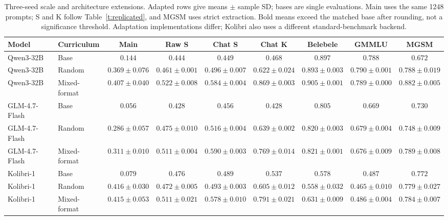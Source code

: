 \begin{table}[t]
\caption{Three-seed scale and architecture extensions. Adapted rows give means $\pm$ sample SD; bases are single evaluations. Main uses the same 1248 prompts; S and K follow Table~\ref{t:replicated}, and MGSM uses strict extraction. Bold means exceed the matched base after rounding, not a significance threshold. Adaptation implementations differ; Kolibri also uses a different standard-benchmark backend.}\label{t:scale}
\centering\scriptsize\setlength{\tabcolsep}{2.5pt}
\begin{tabular}{llccccccc}\toprule
Model & Curriculum & Main & Raw S & Chat S & Chat K & Belebele & GMMLU & MGSM\\\midrule
Qwen3-32B & Base & $0.144$ & $0.444$ & $0.449$ & $0.468$ & $0.897$ & $0.788$ & $0.672$\\
Qwen3-32B & Random & $\mathbf{0.369}\pm0.076$ & $\mathbf{0.461}\pm0.001$ & $\mathbf{0.496}\pm0.007$ & $\mathbf{0.622}\pm0.024$ & $0.893\pm0.003$ & $\mathbf{0.790}\pm0.001$ & $\mathbf{0.788}\pm0.019$\\
Qwen3-32B & Mixed-format & $\mathbf{0.407}\pm0.040$ & $\mathbf{0.522}\pm0.008$ & $\mathbf{0.584}\pm0.004$ & $\mathbf{0.869}\pm0.003$ & $\mathbf{0.905}\pm0.001$ & $\mathbf{0.789}\pm0.000$ & $\mathbf{0.882}\pm0.005$\\
GLM-4.7-Flash & Base & $0.056$ & $0.428$ & $0.456$ & $0.428$ & $0.805$ & $0.669$ & $0.730$\\
GLM-4.7-Flash & Random & $\mathbf{0.286}\pm0.057$ & $\mathbf{0.475}\pm0.010$ & $\mathbf{0.516}\pm0.004$ & $\mathbf{0.639}\pm0.002$ & $\mathbf{0.820}\pm0.003$ & $\mathbf{0.679}\pm0.004$ & $\mathbf{0.748}\pm0.009$\\
GLM-4.7-Flash & Mixed-format & $\mathbf{0.311}\pm0.010$ & $\mathbf{0.511}\pm0.004$ & $\mathbf{0.590}\pm0.003$ & $\mathbf{0.769}\pm0.014$ & $\mathbf{0.821}\pm0.001$ & $\mathbf{0.676}\pm0.009$ & $\mathbf{0.789}\pm0.008$\\
Kolibri-1 & Base & $0.079$ & $0.476$ & $0.489$ & $0.537$ & $0.578$ & $0.487$ & $0.772$\\
Kolibri-1 & Random & $\mathbf{0.416}\pm0.030$ & $0.472\pm0.005$ & $\mathbf{0.493}\pm0.003$ & $\mathbf{0.605}\pm0.012$ & $0.558\pm0.032$ & $0.465\pm0.010$ & $\mathbf{0.779}\pm0.027$\\
Kolibri-1 & Mixed-format & $\mathbf{0.415}\pm0.053$ & $\mathbf{0.511}\pm0.021$ & $\mathbf{0.578}\pm0.010$ & $\mathbf{0.791}\pm0.021$ & $\mathbf{0.631}\pm0.009$ & $0.486\pm0.004$ & $\mathbf{0.784}\pm0.007$\\
\bottomrule\end{tabular}
\end{table}
